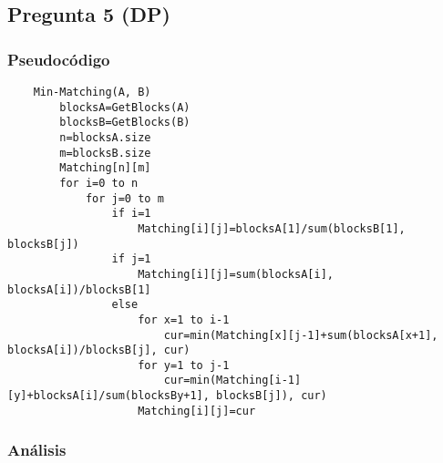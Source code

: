 \subsection*{Pregunta 5 (DP)}
\subsubsection*{Pseudocódigo}

\begin{verbatim}
    Min-Matching(A, B)
        blocksA=GetBlocks(A)
        blocksB=GetBlocks(B)
        n=blocksA.size
        m=blocksB.size
        Matching[n][m]
        for i=0 to n
            for j=0 to m
                if i=1
                    Matching[i][j]=blocksA[1]/sum(blocksB[1], blocksB[j])
                if j=1
                    Matching[i][j]=sum(blocksA[i], blocksA[i])/blocksB[1] 
                else
                    for x=1 to i-1
                        cur=min(Matching[x][j-1]+sum(blocksA[x+1], blocksA[i])/blocksB[j], cur)
                    for y=1 to j-1
                        cur=min(Matching[i-1][y]+blocksA[i]/sum(blocksBy+1], blocksB[j]), cur)
                    Matching[i][j]=cur
\end{verbatim}
\subsubsection*{Análisis}